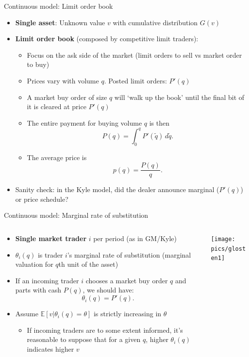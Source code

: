 \documentclass[english,10pt
,aspectratio=169
]{beamer}
\begin{document}
\begin{frame}{Continuous model: Limit order book}
\begin{itemize}
	\item \textbf{Single asset}: Unknown value $v$ with cumulative distribution  $G(v)$
	\item \textbf{Limit order book} (composed by competitive limit traders): 
	\begin{itemize}
		\item Focus on the ask side of the market (limit orders to sell vs market order to buy)
		\item Prices vary with volume $q$. Posted limit orders: $P'(q)$
		\item A market buy order of size $q$ will `walk up the book' until the final bit of it is cleared at price $P'(q)$
		\item The entire payment for buying volume $q$ is then
		\[
		P(q) = \int_0^q P'(\tilde{q}) \, d\tilde{q}.
		\]
		\item The average price is 
		\[
		p(q) = \frac{P(q)}{q}.
		\]
	\end{itemize}
	\pause
	\item Sanity check: in the Kyle model, did the dealer announce \alert{marginal ($P'(q)$)} or  price schedule?
\end{itemize}
\end{frame}


\begin{frame}{Continuous model: Marginal rate of substitution}
	\begin{columns}
		\begin{column}{0.7\linewidth}
			\begin{itemize}
				\item \textbf{Single market trader} $i$ per period (as in GM/Kyle)
				\item $\theta_i(q)$ is trader $i$'s marginal rate of substitution (marginal valuation for $q$th unit of the asset)
				\item If an incoming trader $i$ chooses a market buy order $q$ and parts with cash $P(q)$, we should have: \[\theta_i(q) = P'(q).\]
				\item Assume $\mathbb{E}[v|\theta_i(q) = \theta]$ is strictly increasing in $\theta$
				\begin{itemize}
					\item If incoming traders are to some extent informed, it's reasonable to suppose that for a given $q$, higher $\theta_i(q)$ indicates higher $v$
				\end{itemize}
			\end{itemize}
		\end{column}
		\begin{column}{0.3\linewidth}
			\texttt{[image: pics/glosten1]}
			\vspace{3em}
		\end{column}
	\end{columns}
\end{frame}
\end{document}
